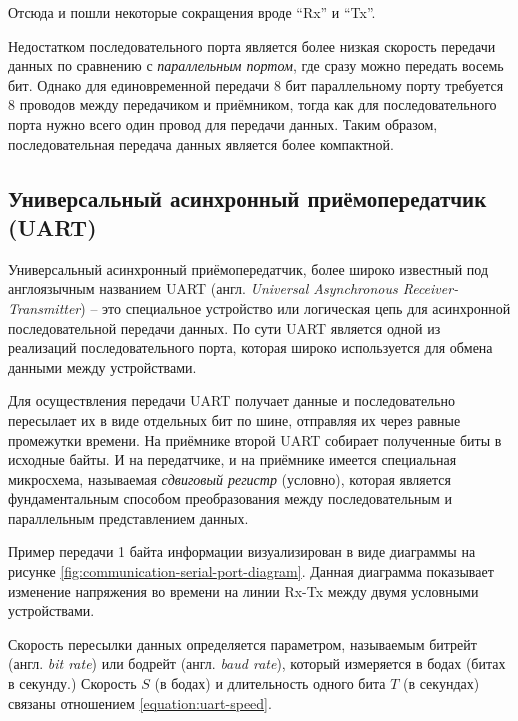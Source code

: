 \documentclass[../sparc.tex]{subfiles}
\begin{document}
Отсюда и пошли некоторые сокращения вроде ``Rx'' и
``Tx''.\autocite{so:krisw}

Недостатком последовательного порта является более низкая скорость передачи
данных по сравнению с \emph{параллельным портом}, где сразу можно передать
восемь бит.  Однако для единовременной передачи 8 бит параллельному порту
требуется 8 проводов между передачиком и приёмником, тогда как для
последовательного порта нужно всего один провод для передачи данных.  Таким
образом, последовательная передача данных является более компактной.

\subsection{Универсальный асинхронный приёмопередатчик (UART)}
\label{section:communication-uart}

Универсальный асинхронный приёмопередатчик, более широко известный под
англоязычным названием \gls{UART} (англ. \emph{Universal Asynchronous
Receiver-Transmitter}) -- это специальное устройство или логическая цепь для
асинхронной последовательной передачи данных.  По сути UART является одной из
реализаций последовательного порта, которая широко используется для обмена
данными между устройствами.

Для осуществления передачи UART получает данные и последовательно пересылает их
в виде отдельных бит по шине, отправляя их через равные промежутки времени.  На
приёмнике второй UART собирает полученные биты в исходные байты.  И на
передатчике, и на приёмнике имеется специальная микросхема, называемая
\emph{сдвиговый регистр} (условно), которая является фундаментальным способом
преобразования между последовательным и параллельным представлением данных.


Пример передачи 1 байта информации визуализирован в виде диаграммы на рисунке
\ref{fig:communication-serial-port-diagram}.  Данная диаграмма показывает
изменение напряжения во времени на линии Rx-Tx между двумя условными
устройствами.


Скорость пересылки данных определяется параметром, называемым битрейт
(англ. \emph{bit rate}) или бодрейт (англ. \emph{baud rate}), который измеряется
в бодах (битах в секунду.)  Скорость $S$ (в бодах) и длительность одного бита
$T$ (в секундах) связаны отношением \ref{equation:uart-speed}.
\end{document}
